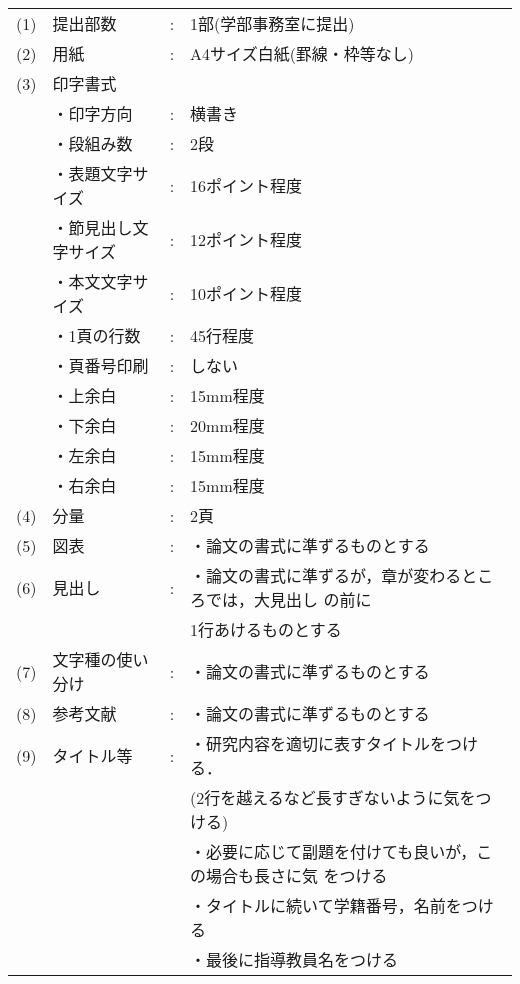   \begin{tabular}{llcl}
    (1)&提出部数&:&1部(学部事務室に提出)\\
    (2)&用紙    &:&A4サイズ白紙(罫線・枠等なし)\\
    (3)&印字書式& & \\
       &\hspace*{1zw}・印字方向&:&横書き\\
       &\hspace*{1zw}・段組み数&:&2段\\
       &\hspace*{1zw}・表題文字サイズ&:&16ポイント程度\\
       &\hspace*{1zw}・節見出し文字サイズ&:&12ポイント程度\\
       &\hspace*{1zw}・本文文字サイズ&:&10ポイント程度\\
       &\hspace*{1zw}・1頁の行数&:&45行程度\\
       &\hspace*{1zw}・頁番号印刷&:&しない\\
       &\hspace*{1zw}・上余白&:&15mm程度\\
       &\hspace*{1zw}・下余白&:&20mm程度\\
       &\hspace*{1zw}・左余白&:&15mm程度\\
       &\hspace*{1zw}・右余白&:&15mm程度\\
    (4)&分量&:&2頁\\
    (5)&図表&:&・論文の書式に準ずるものとする\\
    (6)&見出し&:&・論文の書式に準ずるが，章が変わるところでは，大見出し
        の前に\\
          & & &\hspace*{1zw}1行あけるものとする\\
    (7)&文字種の使い分け&:&・論文の書式に準ずるものとする\\
    (8)&参考文献&:&・論文の書式に準ずるものとする\\
    (9)&タイトル等&:&・研究内容を適切に表すタイトルをつける．\\
          & & &\hspace*{1zw}(2行を越えるなど長すぎないように気をつける)\\
          & & &・必要に応じて副題を付けても良いが，この場合も長さに気
          をつける\\
          & & &・タイトルに続いて学籍番号，名前をつける\\
          & & &・最後に指導教員名をつける\\
  \end{tabular}

\clearpage

